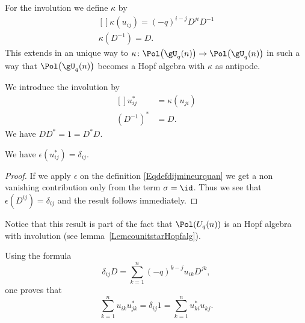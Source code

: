 For the involution we define $\kappa$ by
\begin{equation}        \label{EqDefInvolutionSSUqn}
	\begin{aligned}[]
		\kappa(u_{ij})=(-q)^{i-j}D^{ji}D^{-1} \\
		\kappa(D^{-1})=D.
	\end{aligned}
\end{equation}
This extends in an unique way to $\kappa\colon \Pol\big( \gU_q(n) \big)\to \Pol\big( \gU_q(n) \big)$ in such a way that $\Pol\big( \gU_q(n) \big)$ becomes a Hopf algebra with $\kappa$ as antipode.

We introduce the involution by
\begin{equation}
	\begin{aligned}[]
		u_{ij}^*   & =\kappa(u_{ji}) \\
		(D^{-1})^* & =D.
	\end{aligned}
\end{equation}
We have $DD^*=1=D^*D$.

\begin{lemma}
	We have \( \epsilon(u_{ij}^*)=\delta_{ij}\).
\end{lemma}

\begin{proof}
	If we apply \( \epsilon\) on the definition \eqref{Eqdefdijmineurquan} we get a non vanishing contribution only from the term \( \sigma=\id\). Thus we see that \( \epsilon(D^{ij})=\delta_{ij}\) and the result follows immediately.
\end{proof}
Notice that this result is part of the fact that \( \Pol(U_q(n))\) is an Hopf algebra with involution (see lemma~\ref{LemcounitstarHopfalg}).


Using the formula
\begin{equation}
	\delta_{ij}D=\sum_{k=1}^n(-q)^{k-j}u_{ik}D^{jk},
\end{equation}
one proves that
\begin{equation}        \label{Equustrunsuqn}
	\sum_{k=1}^nu_{ik}u^*_{jk}=\delta_{ij}1=\sum_{k=1}^nu_{ki}^*u_{kj}.
\end{equation}

